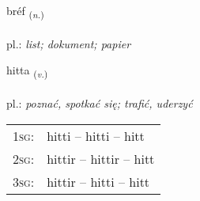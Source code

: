 \documentclass[frontgrid, backgrid]{flacards}\usepackage[]{graphicx}\usepackage[]{xcolor}
\begin{document}
\renewcommand{\blhead}{\vskip5pt {\small\bfseries\footnotesize Nafnorð | Noun }}
\renewcommand{\bcfoot}{\vskip5pt \hspace{2pt}{\small\bfseries\footnotesize 1K}}


{bréf \small{\textsubscript{(\textit{n.})}} \\[1ex] %
\textphonetic{[prjɛːv]} \\
pl.: \emph{list; dokument; papier} \\  [2ex]
\renewcommand*{\arraystretch}{0.8}
}

\renewcommand{\flhead}{\vskip5pt \fboxsep=0pt {\small\bfseries\footnotesize Sagnorð | Verb}}
\renewcommand{\fcfoot}{\vskip5pt \fboxsep=0pt \hspace{2pt}{\small\bfseries\footnotesize 1K}}

\renewcommand{\blhead}{\vskip5pt {\small\bfseries\footnotesize Sagnorð | Verb }}
\renewcommand{\bcfoot}{\vskip5pt \hspace{2pt}{\small\bfseries\footnotesize 1K}}


{hitta \small{\textsubscript{(\textit{v.})}} \\[1ex] %
\textphonetic{[hɪhta]} \\
pl.: \emph{poznać, spotkać się; trafić, uderzyć} \\  [2ex]
\renewcommand*{\arraystretch}{0.8}
\begin{tabular}{p{1cm}l}
\textsc{1sg}: & hitti -- hitti -- hitt \\ 
\textsc{2sg}: & hittir -- hittir -- hitt \\ 
\textsc{3sg}: & hittir -- hitti -- hitt \\ 
\end{tabular}
}
\end{document}
